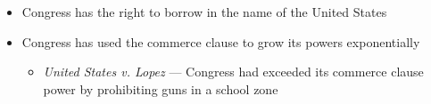 \documentclass[12pt]{article}
\begin{document}
\begin{itemize}
  \item Congress has the right to borrow in the name of the United States

  \item Congress has used the commerce clause to grow its powers exponentially

    \begin{itemize}

      \item \textit{United States v. Lopez} — Congress had exceeded its commerce clause power by prohibiting guns in a school zone

    \end{itemize}

\end{itemize}
\end{document}
